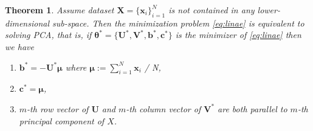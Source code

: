 \documentclass{article}
\newtheorem{theorem}{Theorem}
\begin{document}
    \begin{theorem}
      \label{th:pca}
      Assume dataset $\mathbf{X} = \{\mathbf{x}_i \}_{i=1}^N$
      is not contained in any lower-dimensional sub-space.
      Then the minimization problem \ref{eq:linae} is equivalent to solving PCA, that is, if $\mathbf{\theta}^\ast = \{\mathbf{U}^\ast, \mathbf{V}^\ast, \mathbf{b}^\ast, \mathbf{c}^\ast\}$ is the minimizer of \ref{eq:linae} then we have 
      \begin{enumerate}
        \item $\mathbf{b}^\ast = -\mathbf{U}^\ast \mathbf{\mu}$ where $\mathbf{\mu} := \sum_{i=1}^N \mathbf{x}_i$ / N,
        \item $\mathbf{c}^\ast = \mathbf{\mu}$,
        \item $m$-th row vector of $\mathbf{U}$ and $m$-th column vector of $\mathbf{V}^\ast$ are both parallel to $m$-th principal component of $X$.
      \end{enumerate}
    \end{theorem}
\end{document}
